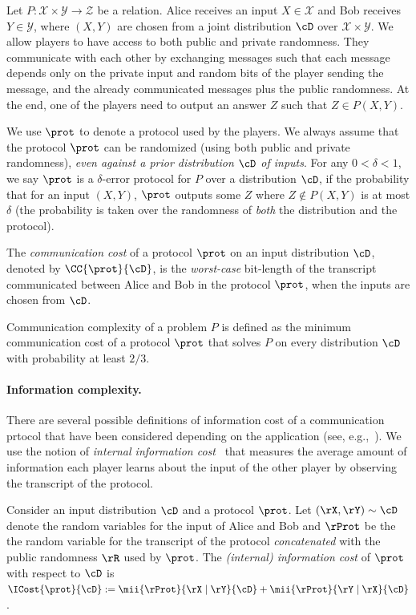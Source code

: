 Let $P: \mathcal{X} \times \mathcal{Y} \rightarrow \mathcal{Z}$ be a relation.  Alice receives an input $X
\in \mathcal{X}$ and Bob receives $Y \in \mathcal{Y}$, where $(X,Y)$ are chosen from a
joint distribution $\cD$ over $\mathcal{X} \times \mathcal{Y}$. We allow players to have access to both public and private randomness. 
They communicate with each other by exchanging messages such that each message
depends only on the private input and random bits of the player sending the message, and the already communicated messages plus the public randomness. 
At the end, one of the players need to output an answer  $Z$ such that $Z \in P(X,Y)$.  

We use $\prot$ to denote a protocol used by the players. We always assume that the protocol $\prot$ can be randomized (using both public and
private randomness), \emph{even against a prior distribution $\cD$ of inputs}. For any
$0 < \delta < 1$, we say $\prot$ is a $\delta$-error protocol for $P$ over a distribution
$\cD$, if the probability that for an input $(X,Y)$, $\prot$ outputs some $Z$ where $Z \notin P(X,Y)$ is at most
$\delta$ (the probability is taken over the randomness of \emph{both} the distribution and the protocol).

\begin{definition}
  The \emph{communication cost} of a protocol $\prot$ on an input
  distribution $\cD$, denoted by $\CC{\prot}{\cD}$, is the \emph{worst-case} bit-length of the transcript
  communicated between Alice and Bob in the protocol $\prot$, when the inputs are chosen from $\cD$.

\end{definition}

Communication complexity of a problem $P$ is defined as the minimum communication cost of a protocol $\prot$ that solves $P$ on every distribution $\cD$ with probability at least $2/3$. 



\paragraph{Information complexity.} There are several possible definitions of information
cost of a communication prtocol that have been considered depending on the application (see, e.g.,~\cite{ChakrabartiSWY01,Bar-YossefJKS02,BarakBCR10,BravermanR11,BravermanEOPV13}).  
We use the notion of \emph{internal information cost}~\cite{BarakBCR10} that measures the average amount of information each player learns about the input of the other player
by observing the transcript of the protocol. %
\begin{definition}
  Consider an input distribution $\cD$ and a protocol $\prot$. Let $(\rX,\rY) \sim \cD$ denote the random variables for the input of Alice and Bob and $\rProt$ be the 
  the random variable for the transcript of the protocol \emph{concatenated} with the public randomness $\rR$ used by $\prot$. 
  The \emph{(internal) information cost} of $\prot$ with respect to
  $\cD$ is $\ICost{\prot}{\cD}:=\mii{\rProt}{\rX \mid \rY}{\cD} + \mii{\rProt}{\rY \mid \rX}{\cD}$. 

\end{definition}

